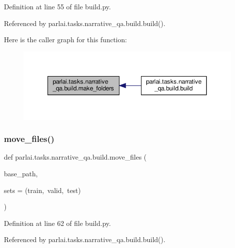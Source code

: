 Definition at line 55 of file build.\+py.



Referenced by parlai.\+tasks.\+narrative\+\_\+qa.\+build.\+build().

Here is the caller graph for this function\+:
\nopagebreak
\begin{figure}[H]
\begin{center}
\leavevmode
\includegraphics[width=340pt]{namespaceparlai_1_1tasks_1_1narrative__qa_1_1build_a602f90b82e6c6eafbd13647ba7567101_icgraph}
\end{center}
\end{figure}
\mbox{\label{namespaceparlai_1_1tasks_1_1narrative__qa_1_1build_a53e5ef8d085ebdfc1cc6c4918841d097}} 
\subsubsection{\texorpdfstring{move\+\_\+files()}{move\_files()}}
{\footnotesize\ttfamily def parlai.\+tasks.\+narrative\+\_\+qa.\+build.\+move\+\_\+files (\begin{DoxyParamCaption}\item[{}]{base\+\_\+path,  }\item[{}]{sets = {\ttfamily (\textquotesingle{}train\textquotesingle{},~\textquotesingle{}valid\textquotesingle{},~\textquotesingle{}test\textquotesingle{})} }\end{DoxyParamCaption})}



Definition at line 62 of file build.\+py.



Referenced by parlai.\+tasks.\+narrative\+\_\+qa.\+build.\+build().

